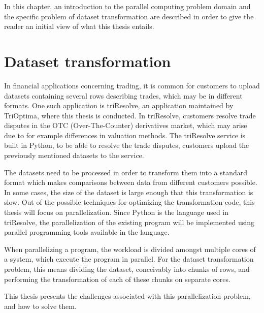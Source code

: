 In this chapter, an introduction to the parallel computing problem domain and the specific problem of dataset transformation are
described in order to give the reader an initial view of what this thesis entails.

\section{Dataset transformation} \label{dataset_standardization}
In financial applications concerning trading, it is common for customers to upload datasets containing several rows describing trades, which may be in different formats.
One such application is triResolve, an application maintained by TriOptima, where this thesis is conducted.  In triResolve, customers resolve trade disputes in the
OTC (Over-The-Counter) derivatives market, which may arise due to for example differences in valuation methods. The triResolve service is built in Python, to be able to resolve
the trade disputes, customers upload the previously mentioned datasets to the service.

The datasets need to be processed in order to transform them into a standard format which makes comparisons between data from different customers possible.
In some cases, the size of the dataset is large enough that this transformation is slow. Out of the possible techniques for optimizing the transformation code,
this thesis will focus on parallelization. Since Python is the language used in triResolve, the parallelization of the existing program will be implemented using
parallel programming tools available in the language. 

When parallelizing a program, the workload is divided amongst multiple cores of a system, which execute the program in parallel.
For the dataset transformation problem, this means dividing the dataset, conceivably into chunks of rows, and performing the transformation of each of these chunks
on separate cores.

This thesis presents the challenges associated with this parallelization problem, and how to solve them.


